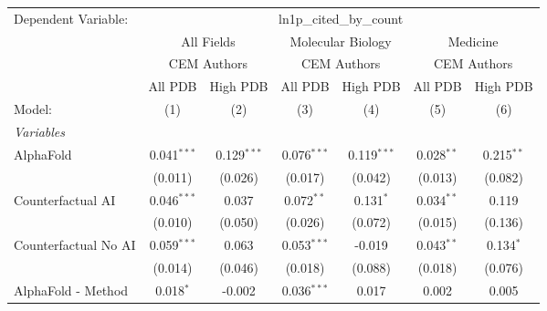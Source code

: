\begingroup
\centering
\begin{tabular}{lcccccc}
   \tabularnewline \midrule \midrule
   Dependent Variable: & \multicolumn{6}{c}{ln1p\_cited\_by\_count}\\
 & \multicolumn{2}{c}{All Fields} & \multicolumn{2}{c}{Molecular Biology} & \multicolumn{2}{c}{Medicine} \\
\cmidrule(lr){2-3} \cmidrule(lr){4-5} \cmidrule(lr){6-7}
 & \multicolumn{2}{c}{CEM Authors} & \multicolumn{2}{c}{CEM Authors} & \multicolumn{2}{c}{CEM Authors} \\
\cmidrule(lr){2-3} \cmidrule(lr){4-5} \cmidrule(lr){6-7}
 & \multicolumn{1}{c}{All PDB} & \multicolumn{1}{c}{High PDB} & \multicolumn{1}{c}{All PDB} & \multicolumn{1}{c}{High PDB} & \multicolumn{1}{c}{All PDB} & \multicolumn{1}{c}{High PDB} \\
\cmidrule(lr){2-2} \cmidrule(lr){3-3} \cmidrule(lr){4-4} \cmidrule(lr){5-5} \cmidrule(lr){6-6} \cmidrule(lr){7-7}
   Model:                                                     & (1)            & (2)           & (3)           & (4)           & (5)            & (6)\\  
   \midrule
   \emph{Variables}\\
   AlphaFold                                                  & 0.041$^{***}$  & 0.129$^{***}$ & 0.076$^{***}$ & 0.119$^{***}$ & 0.028$^{**}$   & 0.215$^{**}$\\   
                                                              & (0.011)        & (0.026)       & (0.017)       & (0.042)       & (0.013)        & (0.082)\\   
   Counterfactual AI                                          & 0.046$^{***}$  & 0.037         & 0.072$^{**}$  & 0.131$^{*}$   & 0.034$^{**}$   & 0.119\\   
                                                              & (0.010)        & (0.050)       & (0.026)       & (0.072)       & (0.015)        & (0.136)\\   
   Counterfactual No AI                                       & 0.059$^{***}$  & 0.063         & 0.053$^{***}$ & -0.019        & 0.043$^{**}$   & 0.134$^{*}$\\   
                                                              & (0.014)        & (0.046)       & (0.018)       & (0.088)       & (0.018)        & (0.076)\\   
   AlphaFold - Method                                         & 0.018$^{*}$    & -0.002        & 0.036$^{***}$ & 0.017         & 0.002          & 0.005\\   

\end{tabular}
